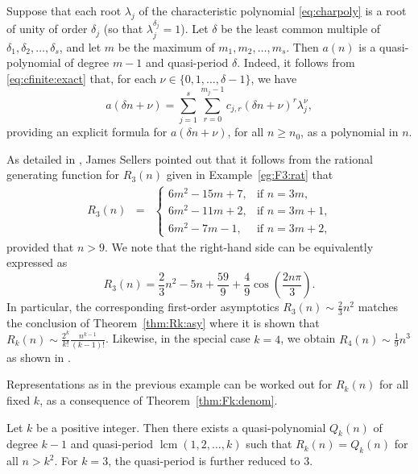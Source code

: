 \documentclass[11pt]{article}
\theoremstyle{plain}
\theoremstyle{definition}
\begin{document}
Suppose that each root $\lambda_j$ of the characteristic polynomial
\eqref{eq:charpoly} is a root of unity of order $\delta_j$ (so that
$\lambda_j^{\delta_j} = 1$). Let $\delta$ be the least common multiple of
$\delta_1, \delta_2, \ldots, \delta_s$, and let $m$ be the maximum of $m_1,
m_2, \ldots, m_s$. Then $a (n)$ is a quasi-polynomial of degree $m - 1$ and
quasi-period $\delta$. Indeed, it follows from \eqref{eq:cfinite:exact} that,
for each $\nu \in \{ 0, 1, \ldots, \delta - 1 \}$, we have
\begin{equation}
  a (\delta n + \nu) = \sum_{j = 1}^s \sum_{r = 0}^{m_j - 1} c_{j, r} (\delta
  n + \nu)^r \lambda_j^{\nu}, \label{eq:cfinite:exact:qp}
\end{equation}
providing an explicit formula for $a (\delta n + \nu)$, for all $n \geq
n_0$, as a polynomial in $n$.

\begin{example}
  \label{eg:R3:qp}As detailed in \cite{sharan-rook}, James Sellers pointed
  out that it follows from the rational generating function for $R_3 (n)$
  given in Example~\ref{eg:F3:rat} that
  \begin{eqnarray*}
    R_3 (n) & = & \left\{\begin{array}{ll}
      6 m^2 - 15 m + 7, & \text{if $n = 3 m$,}\\
      6 m^2 - 11 m + 2, & \text{if $n = 3 m + 1$,}\\
      6 m^2 - 7 m - 1, & \text{if $n = 3 m + 2$,}
    \end{array}\right.
  \end{eqnarray*}
  provided that $n > 9$. We note that the right-hand side can be equivalently
  expressed as
  \begin{equation*}
    R_3 (n) = \frac{2}{3} n^2 - 5 n + \frac{59}{9} + \frac{4}{9} \cos \left(\frac{2 n \pi}{3} \right) .
  \end{equation*}
  In particular, the corresponding first-order asymptotics $R_3 (n) \sim
  \frac{2}{3} n^2$ matches the conclusion of Theorem~\ref{thm:Rk:asy} where it
  is shown that $R_k (n) \sim \frac{2^k}{k!} \frac{n^{k - 1}}{(k - 1) !}$.
  Likewise, in the special case $k = 4$, we obtain $R_4 (n) \sim \frac{1}{9}
  n^3$ as shown in \cite{sharan-rook}.
\end{example}

Representations as in the previous example can be worked out for $R_k (n)$ for
all fixed $k$, as a consequence of Theorem~\ref{thm:Fk:denom}.

\begin{corollary}
  \label{cor:Rk:qp}Let $k$ be a positive integer. Then there exists a
  quasi-polynomial $Q_k (n)$ of degree $k - 1$ and quasi-period $\operatorname{lcm}
  (1, 2, \ldots, k)$ such that $R_k (n) = Q_k (n)$ for all $n > k^2$. For $k =
  3$, the quasi-period is further reduced to $3$.
\end{corollary}
\end{document}
